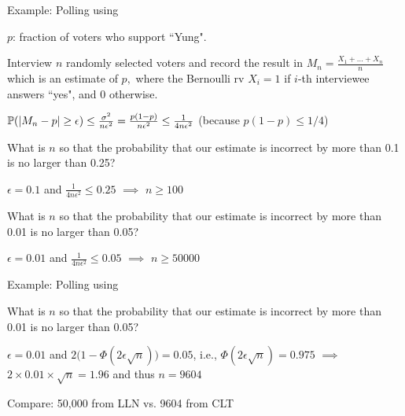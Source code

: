 \begin{frame}{Example: Polling using }

\plitemsep 0.07in

\bci

\item $p$: fraction of voters who support ``Yung".

\item<2-> Interview $n$ randomly selected voters and record the result in $M_n = \frac{X_1+ \ldots + X_n}{n}$ which is an estimate of $p,$ where the Bernoulli rv $X_i=1$ if $i$-th interviewee answers ``yes", and 0 otherwise.

\item<3-> $\mathbb{P}( |M_n - p| \geq \epsilon ) \leq \frac{\sigma^2}{n\epsilon^2} = \frac{p(1-p)}{n \epsilon^2} \leq \frac{1}{4 n \epsilon^2}$ (because $p(1-p) \leq 1/4$)

\item<4-> \question What is $n$ so that the probability that our estimate is incorrect by more than 0.1 is no larger than 0.25?
\bci
\item<5-> $\epsilon = 0.1$ and $\frac{1}{4 n \epsilon^2} \le 0.25$ $\implies$ $n \geq 100$
\eci

\item<6-> \question What is $n$ so that the probability that our estimate is incorrect by more than 0.01 is no larger than 0.05?
\bci
\item<7-> $\epsilon = 0.01$ and $\frac{1}{4 n \epsilon^2} \le 0.05$ $\implies$ $n \geq 50000$
\eci

\eci
\end{frame}

\begin{frame}{Example: Polling using }


\plitemsep 0.1in
\bci

\item<6-> \question What is $n$ so that the probability that our estimate is incorrect by more than 0.01 is no larger than 0.05?
\bci
\item<7-> $\epsilon = 0.01$ and $2\Big(1 - \Phi(2\epsilon \sqrt{n}) \Big) = 0.05$, i.e.,  $\Phi(2\epsilon \sqrt{n}) = 0.975$ $\implies$ $2\times 0.01 \times \sqrt{n}= 1.96$ and thus $n=9604$
\eci

\item<8-> Compare: 50,000 from LLN vs. 9604 from CLT

\eci
\end{frame}


